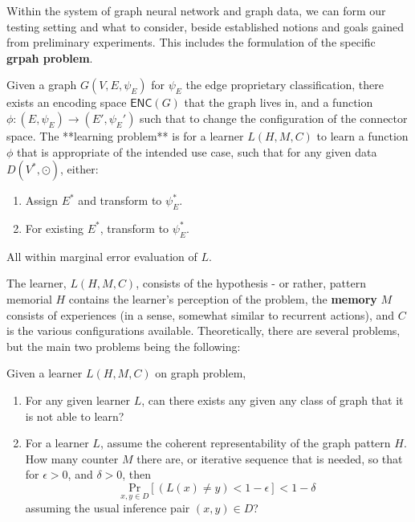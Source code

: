 \documentclass{article}
\begin{document}
Within the system of graph neural network and graph data, we can form our testing setting and what to consider, beside established notions and goals gained from preliminary experiments. This includes the formulation of the specific \textbf{grpah problem}. 
\begin{definition}
  Given a graph $G(V,E,\psi_{E})$ for $\psi_{E}$ the edge proprietary classification, there exists an encoding space $\mathsf{ENC}(G)$ that the graph lives in, and a function $\phi: (E,\psi_{E})\to (E',\psi_{E}')$ such that to change the configuration of the connector space. The **learning problem** is for a learner $L(H,M,C)$ to learn a function $\phi$ that is appropriate of the intended use case, such that for any given data $D(V^{*},\odot)$, either:
  \begin{enumerate}
    \item Assign $E^{*}$ and transform to $\psi_{E}^{*}$. 
    \item For existing $E^{*}$, transform to $\psi^{*}_{E}$. 
  \end{enumerate}
  All within marginal error evaluation of $L$. 
\end{definition}

The learner, $L(H,M,C)$, consists of the hypothesis - or rather, pattern memorial $H$ contains the learner's perception of the problem, the \textbf{memory} $M$ consists of experiences (in a sense, somewhat similar to recurrent actions), and $C$ is the various configurations available. Theoretically, there are several problems, but the main two problems being the following: 

\begin{question}
  Given a learner $L(H,M,C)$ on graph problem, 
  \begin{enumerate}[topsep=0pt,itemsep=0.5pt]
    \item For any given learner $L$, can there exists any given any class of graph that it is not able to learn?
    \item For a learner $L$, assume the coherent representability of the graph pattern $H$. How many counter $M$ there are, or iterative sequence that is needed, so that for $\epsilon>0$, and $\delta>0$, then $$\underset{x,y\in D}{\mathrm{Pr}}[(L(x)\neq y)<1-\epsilon]< 1-\delta$$ assuming the usual inference pair $(x,y)\in D$?
  \end{enumerate}
\end{question}


\clearpage
\end{document}
